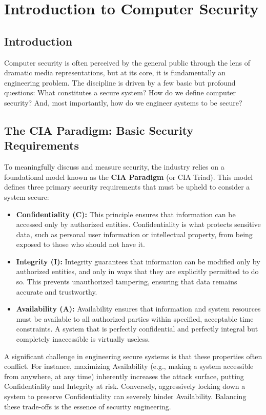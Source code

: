 \chapter{Introduction to Computer Security}
\label{ch:intro_security}

\section{Introduction}
Computer security is often perceived by the general public through the lens of dramatic media representations, but at its core, it is fundamentally an engineering problem. The discipline is driven by a few basic but profound questions: What constitutes a secure system? How do we define computer security? And, most importantly, how do we engineer systems to be secure?

\section{The CIA Paradigm: Basic Security Requirements}
To meaningfully discuss and measure security, the industry relies on a foundational model known as the \textbf{CIA Paradigm} (or CIA Triad). This model defines three primary security requirements that must be upheld to consider a system secure:

\begin{itemize}
    \item \textbf{Confidentiality (C):} This principle ensures that information can be accessed only by authorized entities. Confidentiality is what protects sensitive data, such as personal user information or intellectual property, from being exposed to those who should not have it.
    \item \textbf{Integrity (I):} Integrity guarantees that information can be modified only by authorized entities, and only in ways that they are explicitly permitted to do so. This prevents unauthorized tampering, ensuring that data remains accurate and trustworthy.
    \item \textbf{Availability (A):} Availability ensures that information and system resources must be available to all authorized parties within specified, acceptable time constraints. A system that is perfectly confidential and perfectly integral but completely inaccessible is virtually useless.
\end{itemize}

A significant challenge in engineering secure systems is that these properties often conflict. For instance, maximizing Availability (e.g., making a system accessible from anywhere, at any time) inherently increases the attack surface, putting Confidentiality and Integrity at risk. Conversely, aggressively locking down a system to preserve Confidentiality can severely hinder Availability. Balancing these trade-offs is the essence of security engineering.


